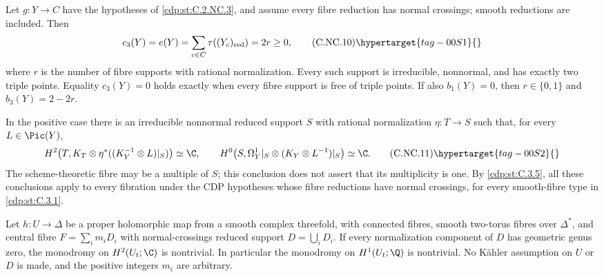 \begin{proposition}\hypertarget{tag-01CC}{}\label{cdp:st:C.2.NC.5}


Let $g:Y\to C$ have the hypotheses of \ref{cdp:st:C.2.NC.3}, and assume every fibre reduction has normal crossings; smooth reductions are included. Then
\[
 c_3(Y)=e(Y)=\sum_{c\in C}\tau((Y_c)_{\rm red})=2r\ge0,
 \tag{C.NC.10}\hypertarget{tag-00S1}{}\label{cdp:eq:C.NC.10}
\]
where $r$ is the number of fibre supports with rational normalization. Every such support is irreducible, nonnormal, and has exactly two triple points. Equality $c_3(Y)=0$ holds exactly when every fibre support is free of triple points. If also $b_1(Y)=0$, then $r\in\{0,1\}$ and $b_3(Y)=2-2r$.

In the positive case there is an irreducible nonnormal reduced support $S$ with rational normalization $\eta:T\to S$ such that, for every $L\in\Pic(Y)$,
\[
 H^2\!\left(T,K_T\otimes\eta^*((K_Y^{-1}\otimes L)|_S)\right)\simeq\C,
 \qquad
 H^0\!\left(S,\Omega_Y^1|_S\otimes(K_Y\otimes L^{-1})|_S\right)\simeq\C.
 \tag{C.NC.11}\hypertarget{tag-00S2}{}\label{cdp:eq:C.NC.11}
\]
The scheme-theoretic fibre may be a multiple of $S$; this conclusion does not assert that its multiplicity is one. By \ref{cdp:st:C.3.5}, all these conclusions apply to every fibration under the CDP hypotheses whose fibre reductions have normal crossings, for every smooth-fibre type in \ref{cdp:st:C.3.1}.
\end{proposition}

\begin{proposition}\hypertarget{tag-01GA}{}\label{cdp:st:D.2.3}



Let $h:U\to\Delta$ be a proper holomorphic map from a smooth
complex threefold, with connected fibres, smooth two-torus fibres
over $\Delta^*$, and central fibre $F=\sum_i m_iD_i$ with
normal-crossings reduced support $D=\bigcup_iD_i$.
If every normalization component of $D$ has geometric genus zero,
the monodromy on $H^2(U_t;\C)$ is nontrivial. In particular the
monodromy on $H^1(U_t;\Q)$ is nontrivial. No K\"ahler assumption
on $U$ or $D$ is made, and the positive integers $m_i$ are arbitrary.
\end{proposition}

